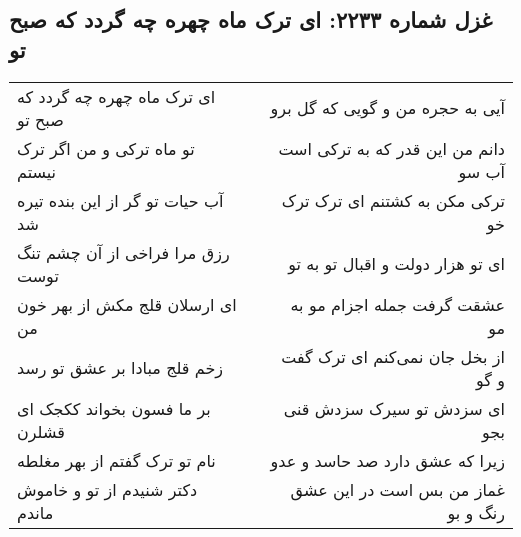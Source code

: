 \begin{center}
\section*{غزل شماره ۲۲۳۳: ای ترک ماه چهره چه گردد که صبح تو}
\label{sec:2233}
\begin{longtable}{l p{0.5cm} r}
ای ترک ماه چهره چه گردد که صبح تو
&&
آیی به حجره من و گویی که گل برو
\\
تو ماه ترکی و من اگر ترک نیستم
&&
دانم من این قدر که به ترکی است آب سو
\\
آب حیات تو گر از این بنده تیره شد
&&
ترکی مکن به کشتنم ای ترک ترک خو
\\
رزق مرا فراخی از آن چشم تنگ توست
&&
ای تو هزار دولت و اقبال تو به تو
\\
ای ارسلان قلج مکش از بهر خون من
&&
عشقت گرفت جمله اجزام مو به مو
\\
زخم قلج مبادا بر عشق تو رسد
&&
از بخل جان نمی‌کنم ای ترک گفت و گو
\\
بر ما فسون بخواند ککجک ای قشلرن
&&
ای سزدش تو سیرک سزدش قنی بجو
\\
نام تو ترک گفتم از بهر مغلطه
&&
زیرا که عشق دارد صد حاسد و عدو
\\
دکتر شنیدم از تو و خاموش ماندم
&&
غماز من بس است در این عشق رنگ و بو
\\
\end{longtable}
\end{center}
